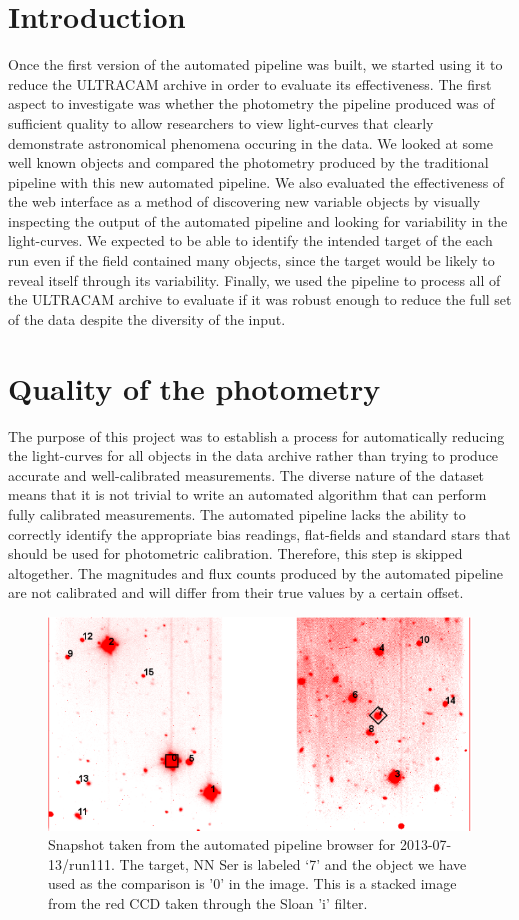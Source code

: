 \section{Introduction}
Once the first version of the automated pipeline was built, we started using it to reduce the ULTRACAM archive in order to evaluate its effectiveness. The first aspect to investigate was whether the photometry the pipeline produced was of sufficient quality to allow researchers to view light-curves that clearly demonstrate astronomical phenomena occuring in the data. We looked at some well known objects and compared the photometry produced by the traditional pipeline with this new automated pipeline. We also evaluated the effectiveness of the web interface as a method of discovering new variable objects by visually inspecting the output of the automated pipeline and looking for variability in the light-curves. We expected to be able to identify the intended target of the each run even if the field contained many objects, since the target would be likely to reveal itself through its variability. Finally, we used the pipeline to process all of the ULTRACAM archive to evaluate if it was robust enough to reduce the full set of the data despite the diversity of the input. 

\section{Quality of the photometry}
The purpose of this project was to establish a process for automatically reducing the light-curves for all objects in the data archive rather than trying to produce accurate and well-calibrated measurements. The diverse nature of the dataset means that it is not trivial to write an automated algorithm that can perform fully calibrated measurements. The automated pipeline lacks the ability to correctly identify the appropriate bias readings, flat-fields and standard stars that should be used for photometric calibration. Therefore, this step is skipped altogether. The magnitudes and flux counts produced by the automated pipeline are not calibrated and will differ from their true values by a certain offset. 

\begin{figure}
\centering
\includegraphics[width=120mm]{images/2013-07-13-run111-r-withlabels.png}
\caption{Snapshot taken from the automated pipeline browser for 2013-07-13/run111. The target, {NN Ser} is labeled `7' and the object we have used as the comparison is  '0' in the image. This is a stacked image from the red CCD taken through the Sloan 'i' filter. }
\label{fig:nnserfield}
\end{figure}

